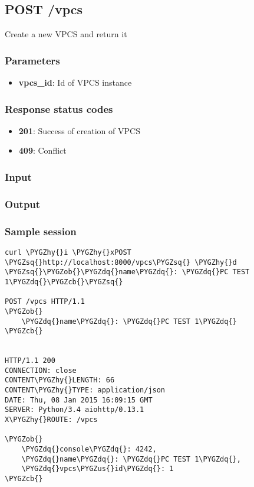 \documentclass[letterpaper,10pt,english]{sphinxmanual}
\def\PYGZus{\char`\_}
\def\PYGZob{\char`\{}
\def\PYGZcb{\char`\}}
\def\PYGZhy{\char`\-}
\def\PYGZsq{\char`\'}
\def\PYGZdq{\char`\"}
\renewcommand\PYGZsq{\textquotesingle}
\begin{document}
\subsection{POST /vpcs}
\label{api/vpcs:post-vpcs}
Create a new VPCS and return it


\subsubsection{Parameters}
\label{api/vpcs:parameters}\begin{itemize}
\item {} 
\textbf{vpcs\_id}: Id of VPCS instance

\end{itemize}


\subsubsection{Response status codes}
\label{api/vpcs:response-status-codes}\begin{itemize}
\item {} 
\textbf{201}: Success of creation of VPCS

\item {} 
\textbf{409}: Conflict

\end{itemize}


\subsubsection{Input}
\label{api/vpcs:input}

\subsubsection{Output}
\label{api/vpcs:output}

\subsubsection{Sample session}
\label{api/vpcs:sample-session}
\begin{Verbatim}[commandchars=\\\{\}]
curl \PYGZhy{}i \PYGZhy{}xPOST \PYGZsq{}http://localhost:8000/vpcs\PYGZsq{} \PYGZhy{}d \PYGZsq{}\PYGZob{}\PYGZdq{}name\PYGZdq{}: \PYGZdq{}PC TEST 1\PYGZdq{}\PYGZcb{}\PYGZsq{}

POST /vpcs HTTP/1.1
\PYGZob{}
    \PYGZdq{}name\PYGZdq{}: \PYGZdq{}PC TEST 1\PYGZdq{}
\PYGZcb{}


HTTP/1.1 200
CONNECTION: close
CONTENT\PYGZhy{}LENGTH: 66
CONTENT\PYGZhy{}TYPE: application/json
DATE: Thu, 08 Jan 2015 16:09:15 GMT
SERVER: Python/3.4 aiohttp/0.13.1
X\PYGZhy{}ROUTE: /vpcs

\PYGZob{}
    \PYGZdq{}console\PYGZdq{}: 4242,
    \PYGZdq{}name\PYGZdq{}: \PYGZdq{}PC TEST 1\PYGZdq{},
    \PYGZdq{}vpcs\PYGZus{}id\PYGZdq{}: 1
\PYGZcb{}
\end{Verbatim}
\end{document}
